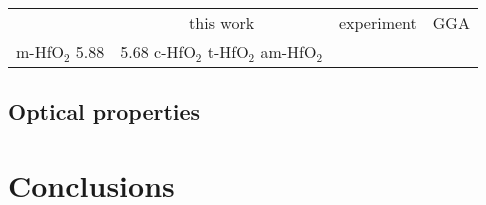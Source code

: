 \documentclass[10pt,a4paper,twocolumn]{article}
\begin{document}
\begin{table}
\begin{center}

\begin{tabular}{c|c|c|c}
			& this work & experiment & GGA \\
m-HfO$_2$	5.88 & 5.68\cite{Balog1977}
c-HfO$_2$
t-HfO$_2$
am-HfO$_2$

\end{tabular}

\end{center}
\end{table}

\subsection{Optical properties}

\section{Conclusions}



\end{document}
